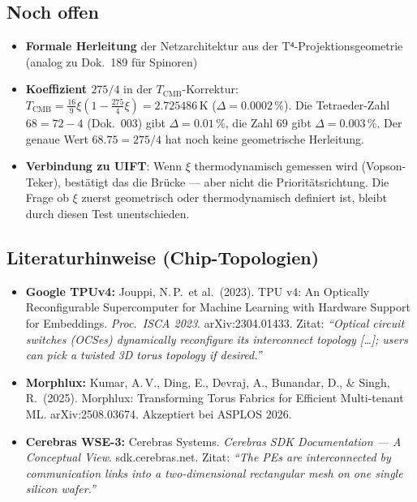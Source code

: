 \subsection*{Noch offen}

\begin{itemize}
  \item \textbf{Formale Herleitung} der Netzarchitektur aus der
        T⁴-Projektionsgeometrie (analog zu Dok.~189 für Spinoren)

  \item \textbf{Koeffizient $275/4$} in der $T_\text{CMB}$-Korrektur:
        $T_\text{CMB} = \tfrac{16}{9}\xi(1 - \tfrac{275}{4}\xi) = 2.725486\,\text{K}$
        ($\Delta = 0.0002\,\%$). Die Tetraeder-Zahl $68 = 72-4$ (Dok.~003) gibt
        $\Delta = 0.01\,\%$, die Zahl $69$ gibt $\Delta = 0.003\,\%$.
        Der genaue Wert $68.75 = 275/4$ hat noch keine geometrische Herleitung.

  \item \textbf{Verbindung zu UIFT}: Wenn $\xi$ thermodynamisch gemessen wird
        (Vopson-Teker), bestätigt das die Brücke --- aber nicht die Prioritätsrichtung.
        Die Frage ob $\xi$ zuerst geometrisch oder thermodynamisch definiert ist,
        bleibt durch diesen Test unentschieden.
\end{itemize}

\subsection*{Literaturhinweise (Chip-Topologien)}

\begin{itemize}\small
  \item \textbf{Google TPUv4:} Jouppi, N.\,P.\ et al.\ (2023).
        TPU v4: An Optically Reconfigurable Supercomputer for Machine
        Learning with Hardware Support for Embeddings.
        \textit{Proc.\ ISCA 2023}. arXiv:2304.01433.
        Zitat: \textit{``Optical circuit switches (OCSes) dynamically
        reconfigure its interconnect topology [\ldots]; users can pick
        a twisted 3D torus topology if desired.''}

  \item \textbf{Morphlux:} Kumar, A.\,V., Ding, E., Devraj, A.,
        Bunandar, D., \& Singh, R.\ (2025).
        Morphlux: Transforming Torus Fabrics for Efficient
        Multi-tenant ML. arXiv:2508.03674. Akzeptiert bei ASPLOS 2026.

  \item \textbf{Cerebras WSE-3:} Cerebras Systems.
        \textit{Cerebras SDK Documentation --- A Conceptual View}.
        sdk.cerebras.net. Zitat: \textit{``The PEs are interconnected
        by communication links into a two-dimensional rectangular
        mesh on one single silicon wafer.''}
\end{itemize}


